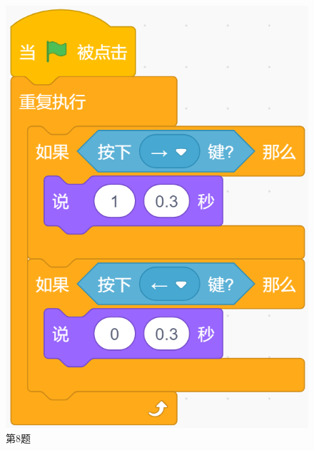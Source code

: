 \documentclass[10pt, a4paper]{article}
\begin{document}
\begin{enumerate}
\begin{figure}[htbp]
\begin{minipage}[t]{.17\textwidth}
                \includegraphics[width=\textwidth]{8.png}
                \caption*{第8题}
            \end{minipage}
            \begin{minipage}[t]{.215\textwidth}
                \centering

\end{minipage}
\end{figure}
\end{enumerate}
\end{document}
